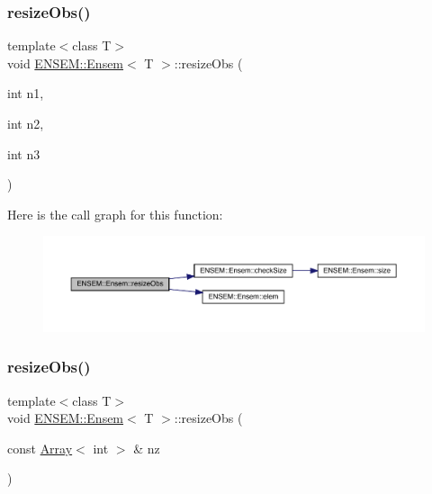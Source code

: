 \subsubsection{\texorpdfstring{resizeObs()}{resizeObs()}\hspace{0.1cm}{\footnotesize\ttfamily [6/8]}}
{\footnotesize\ttfamily template$<$class T$>$ \\
void \mbox{\hyperlink{classENSEM_1_1Ensem}{E\+N\+S\+E\+M\+::\+Ensem}}$<$ T $>$\+::resize\+Obs (\begin{DoxyParamCaption}\item[{int}]{n1,  }\item[{int}]{n2,  }\item[{int}]{n3 }\end{DoxyParamCaption})\hspace{0.3cm}{\ttfamily [inline]}}

Here is the call graph for this function\+:
\nopagebreak
\begin{figure}[H]
\begin{center}
\leavevmode
\includegraphics[width=350pt]{d7/d3e/classENSEM_1_1Ensem_a8d63351cad23f2af13f26c7326d1abcf_cgraph}
\end{center}
\end{figure}
\mbox{\label{classENSEM_1_1Ensem_a4acf05018e5c49c0053dbe8cf76a4252}} 
\subsubsection{\texorpdfstring{resizeObs()}{resizeObs()}\hspace{0.1cm}{\footnotesize\ttfamily [7/8]}}
{\footnotesize\ttfamily template$<$class T$>$ \\
void \mbox{\hyperlink{classENSEM_1_1Ensem}{E\+N\+S\+E\+M\+::\+Ensem}}$<$ T $>$\+::resize\+Obs (\begin{DoxyParamCaption}\item[{const \mbox{\hyperlink{classXMLArray_1_1Array}{Array}}$<$ int $>$ \&}]{nz }\end{DoxyParamCaption})\hspace{0.3cm}{\ttfamily [inline]}}

